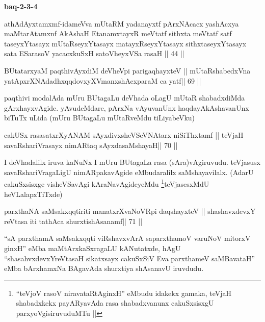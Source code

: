 \begin{center}
{\textbf{baq-2-3-4}}
\end{center}

\begin{shl}
athAdAyxtamxmf-idameVva mUtaRM yadanayxtf pArxNAcacx yashAcxya
maMtarAtamxnf AkAshaH EtanamxtayxR meVtatf sithxta meVtatf satf
taseyxYtasayx mUtaRseyxYtasayx matayxRseyxYtasayx sithxtaseyxYtasayx
sata ESarasoV yacacxkuSxH satoVheyxVSa rasaH || 44 ||
\end{shl}


\begin{shl}
BUtatarxyaM paqthivAyxdiM deVheV\s pi parigaqhayxteV ||
mUtaRshabedxVna yatApxrXNAdadhxqqdovxyXVmanxshAcxparaM ca yatf\hfill || 69 ||
\end{shl}

\begin{artha}
paqthivi modalAda mUru BUtagaLu deVhada oLagU mUtaR shabadxdiMda
gArxhayxvAgide. yAvudeMdare, pArxNa vAyuvanUnx haqdayAkAshavanUnx
biTuTx uLida (mUru BUtagaLu mUtaRveMdu tiLiyabeVku)
\end{artha}



\begin{shl}
cakUSx rasasatxrXyANAM sAyxdivxsheVSeVNAtarx niSiThxtamf ||
teVjaH savaRshariVrasayx nimARtaq sAyxdasaMshayaH\hfill || 70 ||
\end{shl}

\begin{artha}
I deVhadalilx iruva kaNuNx I mUru BUtagaLa rasa (sAra)vAgiruvudu.
teVjasusx savaRshariVragaLigU nimARpakavAgide eMbudaralilx
saMshayavilalx. (AdarU cakuSxsisxge visheVSavAgi
kAraNavAgideyeMdu \footnote{``teVjoV rasoV niravataRtAginxH'' eMbudu
  idakekx gamaka, teVjaH shabadxkekx payARyavAda rasa shabadxvanunx
  cakuSxsisxgU parxyoVgisiruvuduMTu ||}teVjasesxMdU heVLalapxTiTxde)
\end{artha}



\begin{shl}
parxthaNA saMsakxqqtiriti manatxrXvaNoVR\s pi daqshayxteV ||
shashavxdevxY reVtasa iti tathAca shurxtishAsanamf\hfill || 71 ||
\end{shl}

\begin{artha}
``sA parxthamA saMsakxqqti viRshavxvArA saparxthamoV varuNoV mitorxV\s
  ginxH'' eMba maMtArxkaSxragaLU kANutatxde, hAgU
  ``shasahvxdevxYreVtasaH sikatxsayx cakuSxSiV Eva parxthameV
  saMBavataH'' eMba bArxhamxNa BAgavAda shurxtiya shAsanavU iruvdudu.
\end{artha}

